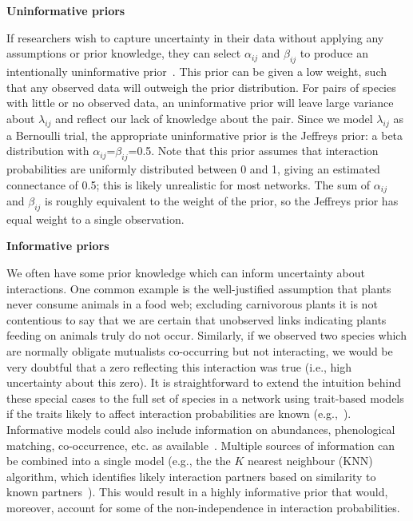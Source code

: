 \documentclass[12pt]{article}
\begin{document}
\begin{spacing}{2.0}
      \textbf{Uninformative priors}

        If researchers wish to capture uncertainty in their data without applying any assumptions or prior knowledge, they can select $\alpha_{ij}$ and $\beta_{ij}$ to produce an intentionally uninformative prior~\citep{Leyland2005,Berger2006}. This prior can be given a low weight, such that any observed data will outweigh the prior distribution. For pairs of species with little or no observed data, an uninformative prior will leave large variance about $\lambda_{ij}$ and reflect our lack of knowledge about the pair. Since we model $\lambda_{ij}$ as a Bernoulli trial, the appropriate uninformative prior is the Jeffreys prior: a beta distribution with $\alpha_{ij}$=$\beta_{ij}$=0.5. Note that this prior assumes that interaction probabilities are uniformly distributed between 0 and 1, giving an estimated connectance of 0.5; this is likely unrealistic for most networks. The sum of $\alpha_{ij}$ and $\beta_{ij}$ is roughly equivalent to the weight of the prior, so the Jeffreys prior has equal weight to a single observation. 


      \textbf{Informative priors}

        We often have some prior knowledge which can inform uncertainty about interactions. One common example is the well-justified assumption that plants never consume animals in a food web; excluding carnivorous plants it is not contentious to say that we are certain that unobserved links indicating plants feeding on animals truly do not occur. Similarly, if we observed two species which are normally obligate mutualists co-occurring but not interacting, we would be very doubtful that a zero reflecting this interaction was true (i.e., high uncertainty about this zero). It is straightforward to extend the intuition behind these special cases to the full set of species in a network using trait-based models if the traits likely to affect interaction probabilities are known (e.g.,~\citet{Gravel2013,Bartomeus2016,Weinstein2017}). Informative models could also include information on abundances, phenological matching, co-occurrence, etc. as available~\citep{Jordano2016,Weinstein2017a,Gravel2018}. Multiple sources of information can be combined into a single model (e.g., the the $K$ nearest neighbour (KNN) algorithm, which identifies likely interaction partners based on similarity to known partners~\citep{DesjardinsProulx2017}). This would result in a highly informative prior that would, moreover, account for some of the non-independence in interaction probabilities. 



\end{spacing}
\end{document}
